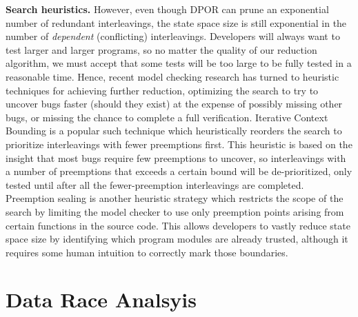 {\bf Search heuristics.}
However, even though DPOR can prune an exponential number of redundant interleavings, the state space size is still exponential in the number of {\em dependent} (conflicting) interleavings.
Developers will always want to test larger and larger programs, so no matter the quality of our reduction algorithm,
we must accept that some tests will be too large to be fully tested in a reasonable time.
Hence, recent model checking research has turned to heuristic techniques for achieving further reduction,
optimizing the search to try to uncover bugs faster (should they exist)
at the expense of possibly missing other bugs,
or missing the chance to complete a full verification.
Iterative Context Bounding \cite{chess-icb} is a popular such technique which heuristically reorders the search to prioritize interleavings with fewer preemptions first.
This heuristic is based on the insight that most bugs require few preemptions to uncover, so interleavings with a number of preemptions that exceeds a certain bound will be de-prioritized, only tested until after all the fewer-preemption interleavings are completed.
Preemption sealing \cite{sealing} is another heuristic strategy which restricts the scope of the search by limiting the model checker to use only preemption points arising from certain functions in the source code.
This allows developers to vastly reduce state space size by identifying which program modules are already trusted,
although it requires some human intuition to correctly mark those boundaries.


\section{Data Race Analsyis}

